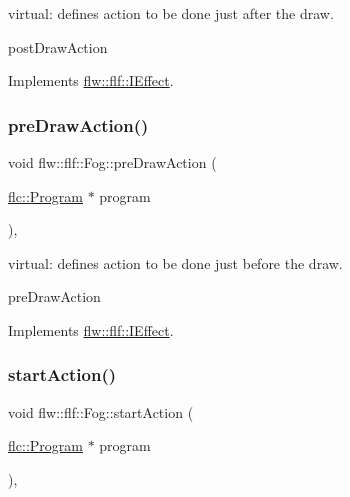 virtual\+: defines action to be done just after the draw. 

post\+Draw\+Action 

Implements \hyperlink{classflw_1_1flf_1_1IEffect_a6bb11d90e7e4da057ca398bd8c61208a}{flw\+::flf\+::\+I\+Effect}.

\mbox{\label{classflw_1_1flf_1_1Fog_a0d426e670e2b976601144e28c7dc5a48}} 
\subsubsection{\texorpdfstring{pre\+Draw\+Action()}{preDrawAction()}}
{\footnotesize\ttfamily void flw\+::flf\+::\+Fog\+::pre\+Draw\+Action (\begin{DoxyParamCaption}\item[{\hyperlink{classflw_1_1flc_1_1Program}{flc\+::\+Program} $\ast$}]{program }\end{DoxyParamCaption})\hspace{0.3cm}{\ttfamily [override]}, {\ttfamily [virtual]}}



virtual\+: defines action to be done just before the draw. 

pre\+Draw\+Action 

Implements \hyperlink{classflw_1_1flf_1_1IEffect_ae65eed21e40a226c7739d3c5dedd9e50}{flw\+::flf\+::\+I\+Effect}.

\mbox{\label{classflw_1_1flf_1_1Fog_a12acc2ae25d54721648265aa863c8b1e}} 
\subsubsection{\texorpdfstring{start\+Action()}{startAction()}}
{\footnotesize\ttfamily void flw\+::flf\+::\+Fog\+::start\+Action (\begin{DoxyParamCaption}\item[{\hyperlink{classflw_1_1flc_1_1Program}{flc\+::\+Program} $\ast$}]{program }\end{DoxyParamCaption})\hspace{0.3cm}{\ttfamily [override]}, {\ttfamily [virtual]}}



